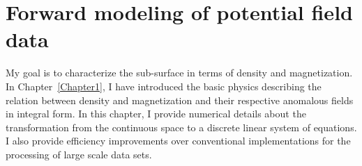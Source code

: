 \graphicspath{{./../../Figures/}}
\chapter{Forward modeling of potential field data}
\label{Chapter2}
My goal is to characterize the sub-surface in terms of density and magnetization. In Chapter~\ref{Chapter1}, I have introduced the basic physics describing the relation between density and magnetization and their respective anomalous fields in integral form. In this chapter, I provide numerical details about the transformation from the continuous space to a discrete linear system of equations. I also provide efficiency improvements over conventional implementations for the processing of large scale data sets.

